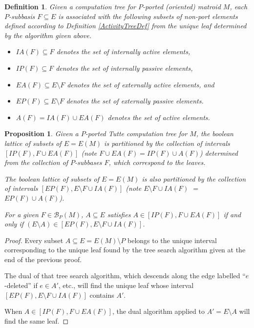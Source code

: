 \documentclass[12pt,leqno]{amsart}
\newtheorem{prop}[lem]{Proposition}
\newtheorem{definition}[lem]{Definition}
\theoremstyle{remark}
\begin{document}
\begin{definition}
\label{ActivitySymbolsDef}
Given a computation tree for 
$P$-ported (oriented) matroid $M$,
each $P$-subbasis $F\subseteq E$
is associated with the following subsets of non-port elements
defined according to Definition \ref{ActivityTreeDef}
from the unique leaf determined by the algorithm given above.
\begin{itemize}
\item $IA(F)\subseteq F$ denotes the set of internally active elements,
\item $IP(F)\subseteq F$ denotes the set of internally passive elements,
\item $EA(F)\subseteq E\setminus F$ 
denotes the set of externally active elements,
and 
\item $EP(F)\subseteq E\setminus F$ denotes the set of externally
passive elements.
\item $A(F)=IA(F)\cup EA(F)$ denotes the set of active elements.
\end{itemize}
\end{definition}

\begin{prop}
\label{PartitionProposition}
Given a $P$-ported Tutte computation tree for
$M$, 
the boolean lattice of subsets of $E=E(M)$
is partitioned by the collection of
intervals $[IP(F),F\cup EA(F)]$ (note $F\cup EA(F)=IP(F)\cup A(F)$)
determined from the collection
of $P$-subbases $F$, which correspond to the leaves.

The boolean lattice of subsets of $E=E(M)$
is also partitioned by the collection of
intervals $[EP(F),E\setminus F\cup IA(F)]$ 
(note $E\setminus F\cup IA(F)$ $=$ $EP(F)\cup A(F)$).

For a given $F\in\mathcal{B}_P(M)$, $A\subseteq E$ satisfies
$A\in [IP(F),F\cup EA(F)]$ if and only if 
$(E\setminus A)\in [EP(F),E\setminus F\cup IA(F)]$. 
\end{prop}

\begin{proof}
Every subset $A\subseteq E=E(M)\setminus P$ belongs to the
unique interval corresponding to the unique leaf found by the tree search 
algorithm given at the end of the previous proof.  

The dual of that tree search algorithm, which descends along
the edge labelled ``$e$-deleted'' if $e\in A'$, etc., will find the
unique leaf whose interval $[EP(F),E\setminus F\cup IA(F)]$ contains
$A'$.

When $A\in[IP(F),F\cup EA(F)]$, the dual algorithm applied to
$A'=E\setminus A$ will find the same leaf.
\end{proof}
\end{document}
